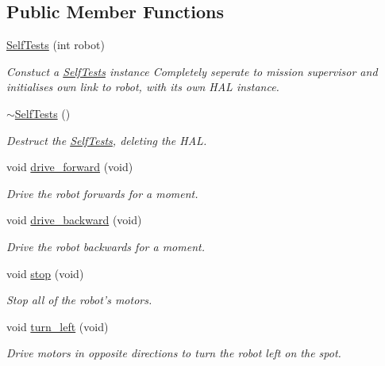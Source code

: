 \subsection*{Public Member Functions}
\begin{DoxyCompactItemize}
\item 
\hyperlink{classIDP_1_1SelfTests_a6864b03502cc5d1ac3728b456b04238f}{SelfTests} (int robot)
\begin{DoxyCompactList}\small\item\em Constuct a \hyperlink{classIDP_1_1SelfTests}{SelfTests} instance Completely seperate to mission supervisor and initialises own link to robot, with its own HAL instance. \item\end{DoxyCompactList}\item 
\hyperlink{classIDP_1_1SelfTests_a5a49e246d28af6332dd46f8b22dcddc7}{$\sim$SelfTests} ()
\begin{DoxyCompactList}\small\item\em Destruct the \hyperlink{classIDP_1_1SelfTests}{SelfTests}, deleting the HAL. \item\end{DoxyCompactList}\item 
void \hyperlink{classIDP_1_1SelfTests_a4ff456e74d55e13599cf64db76bd2ed4}{drive\_\-forward} (void)
\begin{DoxyCompactList}\small\item\em Drive the robot forwards for a moment. \item\end{DoxyCompactList}\item 
void \hyperlink{classIDP_1_1SelfTests_a38ddef7ecdf9b7dfa69d689c9c1ac8ca}{drive\_\-backward} (void)
\begin{DoxyCompactList}\small\item\em Drive the robot backwards for a moment. \item\end{DoxyCompactList}\item 
void \hyperlink{classIDP_1_1SelfTests_a33adf462d8c408b1c7b4858e9a4ff000}{stop} (void)
\begin{DoxyCompactList}\small\item\em Stop all of the robot's motors. \item\end{DoxyCompactList}\item 
void \hyperlink{classIDP_1_1SelfTests_a3ba14e5a1ed52ff112bc742b94f06d61}{turn\_\-left} (void)
\begin{DoxyCompactList}\small\item\em Drive motors in opposite directions to turn the robot left on the spot. \item\end{DoxyCompactList}\item 

\end{DoxyCompactItemize}
